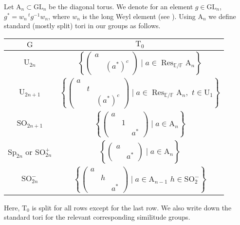 \documentclass[12pt, reqno]{amsart}
\theoremstyle{definition}
\theoremstyle{definition}
\theoremstyle{definition}
\newcommand{\transpose}[1]{\, {}^{t}#1}
\newcommand{\involution}[1]{#1^{c}}
\newcommand{\GL}{\mathrm{GL}}
\newcommand{\SO}{\mathrm{SO}}
\newcommand{\Sp}{\mathrm{Sp}}
\newcommand{\UnitaryGroup}{\mathrm{U}}
\newcommand{\finiteField}{\mathbb{F}}
\newcommand{\quadraticExtension}{\mathbb{E}}
\newcommand{\restrictionOfScalars}[3]{\operatorname{Res}_{#1 \slash #2}{#3}}
\newcommand{\algebraicGroup}[1]{\boldsymbol{\mathrm{#1}}}
\begin{document}
Let $\algebraicGroup{A}_n \subset \algebraicGroup{\GL}_n$ be the diagonal torus. We denote for an element $g \in \algebraicGroup{\GL}_n$, $g^{\ast} = w_n \transpose{g}^{-1} w_n$, where $w_n$ is the long Weyl element (see ). Using $\algebraicGroup{A}_n$ we define standard (mostly split) tori in our groups as follows.
\begin{center}
\begin{tabular}{|c|c|}
	\hline 
		$\algebraicGroup{G}$ & $\algebraicGroup{T}_0$ \tabularnewline
		\hline 
		\hline 
		$\algebraicGroup{\UnitaryGroup}_{2n}$ & $\left\{ \begin{pmatrix}
			a\\
			& \involution{\left(a^{\ast}\right)}
		\end{pmatrix}  \mid a \in \restrictionOfScalars{\quadraticExtension}{\finiteField}{\algebraicGroup{A}_n} \right\}$ \tabularnewline
		\hline 
		$\algebraicGroup{\UnitaryGroup}_{2n+1}$ & $\left\{ \begin{pmatrix}
	a \\
	& t\\
	& & \involution{\left(a^{\ast}\right)}
\end{pmatrix}  \mid a \in \restrictionOfScalars{\quadraticExtension}{\finiteField}{\algebraicGroup{A}_n},\,\, t \in \algebraicGroup{U}_1 \right\}$ \tabularnewline
\hline 
	$\algebraicGroup{\SO}_{2n+1}$ & $\left\{ \begin{pmatrix}
		a\\
		& 1\\
		& & a^{\ast}
	\end{pmatrix} \mid a \in \algebraicGroup{A}_n \right\}$ \tabularnewline
	\hline 
	$\algebraicGroup{\Sp}_{2n}$ or $\algebraicGroup{\SO}^{+}_{2n}$ & $\left\{ \begin{pmatrix}
		a\\
		& a^{\ast}
	\end{pmatrix} \mid a \in \algebraicGroup{A}_n \right\}$ \tabularnewline
	\hline 
	$\algebraicGroup{\SO}_{2n}^{-}$ & $\left\{ \begin{pmatrix}
		a\\
		& h\\
		& & a^{\ast}
	\end{pmatrix} \mid a \in \algebraicGroup{A}_{n-1}\,\, h \in \algebraicGroup{\SO}_2^{-} \right\}$ \tabularnewline
	\hline		
	\end{tabular}
\end{center}
Here, $\algebraicGroup{T}_{0}$ is split for all rows except for the last row. We also write down the standard tori for the relevant corresponding similitude groups.
\end{document}
